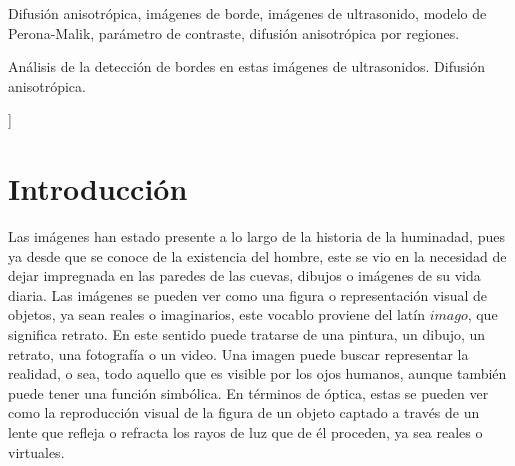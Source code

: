 \documentclass[a4paper,10pt,twocolumn]{article}
\begin{document}
\begin{keywords}
Difusión anisotrópica, imágenes de borde, imágenes de ultrasonido, modelo de Perona-Malik, parámetro de contraste, difusión anisotrópica por regiones.
\end{keywords}

\begin{topics}
An\'alisis de la detecci\'on de bordes en estas im\'agenes de ultrasonidos. Difusi\'on anisotr\'opica.
\end{topics}

\vspace{0.8cm}
]

\section{Introducción}\label{sec:introduccion}
Las im\'agenes han estado presente a lo largo de la historia de la huminadad, pues ya desde que se conoce de la existencia del hombre, este se vio en la necesidad de dejar impregnada en las paredes de las cuevas, dibujos o im\'agenes de su vida diaria. Las im\'agenes se pueden ver como una figura o representaci\'on visual de objetos, ya sean reales o imaginarios, este vocablo proviene del lat\'in $imago$, que significa retrato. En este sentido puede tratarse de una pintura, un dibujo, un retrato, una fotograf\'ia o un video. Una imagen puede buscar representar la realidad, o sea, todo aquello que es visible por los ojos humanos, aunque tambi\'en puede tener una funci\'on simb\'olica. En t\'erminos de \'optica, estas se pueden ver como la reproducci\'on visual de la figura de un objeto captado a trav\'es de un lente que refleja o refracta los rayos de luz que de \'el proceden, ya sea reales o virtuales.
\end{document}
